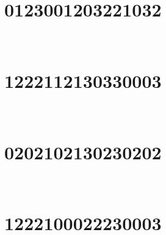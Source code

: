 
\section{0123001203221032}

\marginnote[3\baselineskip]{\centering}



\,
\newline
\vspace{1.2cm}

\section{1222112130330003}

\marginnote[3\baselineskip]{\centering}



\,
\newline
\vspace{1.2cm}

\section{0202102130230202}

\marginnote[3\baselineskip]{\centering}



\,
\newline
\vspace{1.2cm}

\section{1222100022230003}

\marginnote[3\baselineskip]{\centering}



\,
\newline
\vspace{1.2cm}

